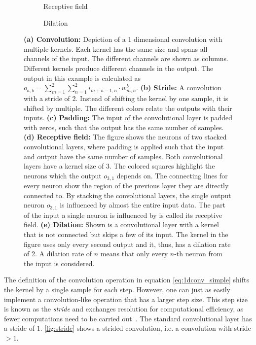 \begin{figure}
	\begin{subfigure}[b]{.3\linewidth}
		\resizebox{\linewidth}{!}{}
		\caption{Receptive field}\label{fig:receptive_field}
	\end{subfigure}
	\hspace{0.03\linewidth}
	\begin{subfigure}[b]{.3\linewidth}
		\resizebox{\linewidth}{!}{}
		\caption{Dilation}\label{fig:dilation}
	\end{subfigure}
\caption[Convolutional layer and its options]{\textbf{(a) Convolution:} Depiction of a 1 dimensional convolution with multiple kernels. Each kernel has the same size and spans all channels of the input. The different channels are shown as columns. Different kernels produce different channels in the output. The output in this example is calculated as $o_{a,b}=\sum_{m=1}^2\sum_{n=1}^2i_{m+a-1,n}\cdot w^b_{m,n}$. \textbf{(b) Stride:} A convolution with a stride of 2. Instead of shifting the kernel by one sample, it is shifted by multiple. The different colors relate the outputs with their inputs. \textbf{(c) Padding:} The input of the convolutional layer is padded with zeros, such that the output has the same number of samples. \textbf{(d) Receptive field:} The figure shows the neurons of two stacked convolutional layers, where padding is applied such that the input and output have the same number of samples. Both convolutional layers have a kernel size of 3. The colored squares highlight the neurons which the output $o_{3,1}$ depends on. The connecting lines for every neuron show the region of the previous layer they are directly connected to. By stacking the convolutional layers, the single output neuron $o_{3,1}$ is influenced by almost the entire input data. The part of the input a single neuron is influenced by is called its receptive field. \textbf{(e) Dilation:} Shown is a convolutional layer with a kernel that is not connected but skips a few of its input. The kernel in the figure uses only every second output and it, thus, has a dilation rate of 2. A dilation rate of $n$ means that only every $n$-th neuron from the input is considered.}\label{fig:conv_options}
\end{figure}

The definition of the convolution operation in equation \eqref{eq:1dconv_simple} shifts the kernel by a single sample for each step. However, one can just as easily implement a convolution-like operation that has a larger step size. This step size is known as the \emph{stride} and exchanges resolution for computational efficiency, as fewer computations need to be carried out~\cite{Goodfellow:2016:DNN}. The standard convolutional layer has a stride of $1$. \autoref{fig:stride} shows a strided convolution, i.e. a convolution with stride $> 1$.

